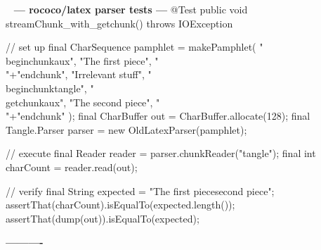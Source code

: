 \documentclass{book}
\newenvironment{chunk}[1]{%
{\ }\newline\noindent%
\hbox{\hskip 2.0cm}{\bf --- #1 ---}%
\verbatim}%                               say exactly what we see
{\endverbatim%
\par{}%
\noindent{}%
\hbox{\hskip 2.0cm}{\bf ----------}%
\par%
\normalsize\noindent}%
\providecommand{\getchunk}[1]{%
\noindent%
{\small $\backslash{}$begin\{chunk\}\{{\bf #1}\}}%
\index{{#1}}}
\begin{document}
\begin{chunk}{rococo/latex parser tests}
@Test
public void streamChunk_with_getchunk() throws IOException {
    // set up
    final CharSequence pamphlet = makePamphlet(
            "\\begin{chunk}{aux}",
            "The first piece",
            "\\"+"end{chunk}",
            "Irrelevant stuff",
            "\\begin{chunk}{tangle}",
            "\\getchunk{aux}",
            "The second piece",
            "\\"+"end{chunk}"
    );
    final CharBuffer out = CharBuffer.allocate(128);
    final Tangle.Parser parser = new OldLatexParser(pamphlet);

    // execute
    final Reader reader = parser.chunkReader("tangle");
    final int charCount = reader.read(out);

    // verify
    final String expected = "The first piece\nThe second piece\n";
    assertThat(charCount).isEqualTo(expected.length());
    assertThat(dump(out)).isEqualTo(expected);
}
\end{chunk}
\end{document}
